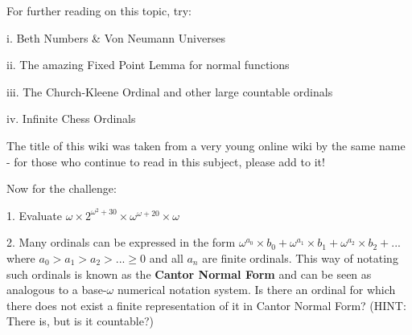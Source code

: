For further reading on this topic, try:

i. Beth Numbers \& Von Neumann Universes

ii. The amazing Fixed Point Lemma for normal functions

iii. The Church-Kleene Ordinal and other large countable ordinals

iv. Infinite Chess Ordinals

The title of this wiki was taken from a very young online wiki by the same name - for those who continue to read in this subject, please add to it!

Now for the challenge:

1. Evaluate \(\omega\times{}2^{\omega^2+30}\times{}\omega^{\omega+20}\times{}\omega\)

2. Many ordinals can be expressed in the form \(\omega^{a_0}\times{}b_0 + \omega^{a_1}\times{}b_1+\omega^{a_2}\times{}b_2+...\) where \(a_0 > a_1 > a_2 > ... \geq 0\) and all \(a_n\) are finite ordinals. This way of notating such ordinals is known as the \textbf{Cantor Normal Form} and can be seen as analogous to a base-\(\omega\) numerical notation system. Is there an ordinal for which there does not exist a finite representation of it in Cantor Normal Form? (HINT: There is, but is it countable?)

